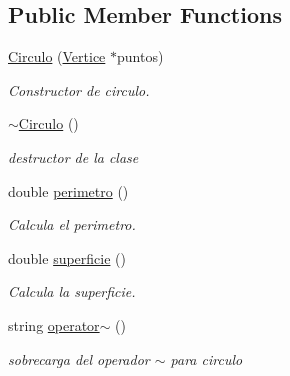 \subsection*{Public Member Functions}
\begin{DoxyCompactItemize}
\item 
\hyperlink{class_circulo_a790ee75260b927c3b54d534a5d2bab1c}{Circulo} (\hyperlink{class_vertice}{Vertice} $\ast$puntos)
\begin{DoxyCompactList}\small\item\em Constructor de circulo. \end{DoxyCompactList}\item 
\mbox{\label{class_circulo_a8efe39e0e89487519cd802f0738d3bf4}} 
\hyperlink{class_circulo_a8efe39e0e89487519cd802f0738d3bf4}{$\sim$\+Circulo} ()
\begin{DoxyCompactList}\small\item\em destructor de la clase \end{DoxyCompactList}\item 
\mbox{\label{class_circulo_acc35f8fdd7303fca9fe54b0da458bdf2}} 
double \hyperlink{class_circulo_acc35f8fdd7303fca9fe54b0da458bdf2}{perimetro} ()
\begin{DoxyCompactList}\small\item\em Calcula el perimetro. \end{DoxyCompactList}\item 
\mbox{\label{class_circulo_a12314ab6d649a9e6c1300c6950a46ce7}} 
double \hyperlink{class_circulo_a12314ab6d649a9e6c1300c6950a46ce7}{superficie} ()
\begin{DoxyCompactList}\small\item\em Calcula la superficie. \end{DoxyCompactList}\item 
\mbox{\label{class_circulo_ac79dde5c3b5205403a91c694054a3d66}} 
string \hyperlink{class_circulo_ac79dde5c3b5205403a91c694054a3d66}{operator$\sim$} ()
\begin{DoxyCompactList}\small\item\em sobrecarga del operador $\sim$ para circulo \end{DoxyCompactList}\item 
\mbox{\label{class_circulo_acc35f8fdd7303fca9fe54b0da458bdf2}} 

\end{DoxyCompactItemize}
